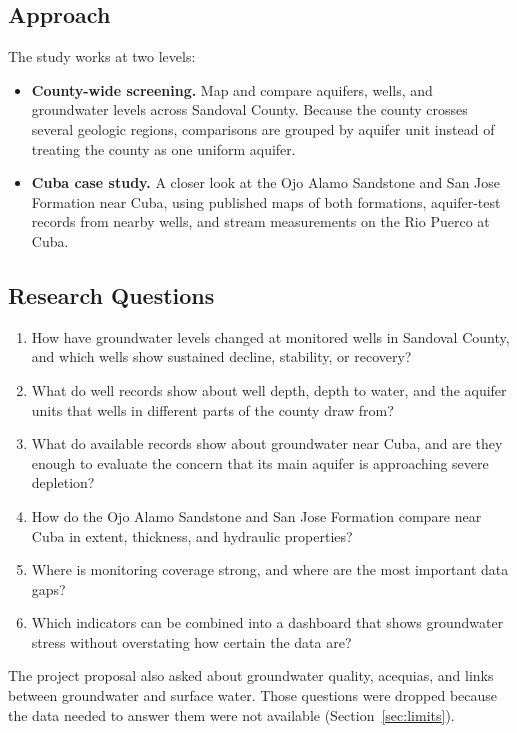\documentclass[10pt,twocolumn,letterpaper]{article}
\begin{document}
\subsection{Approach}
The study works at two levels:
\begin{itemize}
  \item \textbf{County-wide screening.} Map and compare aquifers, wells, and groundwater levels
        across Sandoval County. Because the county crosses several geologic regions, comparisons
        are grouped by aquifer unit instead of treating the county as one uniform aquifer.
  \item \textbf{Cuba case study.} A closer look at the Ojo Alamo Sandstone and San Jose Formation
        near Cuba, using published maps of both formations, aquifer-test records from nearby
        wells, and stream measurements on the Rio Puerco at Cuba.
\end{itemize}

\subsection{Research Questions}
\begin{enumerate}[label={\color{titleblue}\bfseries RQ\arabic*.},leftmargin=2.6em,labelsep=0.4em]
  \item How have groundwater levels changed at monitored wells in Sandoval County, and which wells
        show sustained decline, stability, or recovery?
  \item What do well records show about well depth, depth to water, and the aquifer units that
        wells in different parts of the county draw from?
  \item What do available records show about groundwater near Cuba, and are they enough to
        evaluate the concern that its main aquifer is approaching severe depletion?
  \item How do the Ojo Alamo Sandstone and San Jose Formation compare near Cuba in extent,
        thickness, and hydraulic properties?
  \item Where is monitoring coverage strong, and where are the most important data gaps?
  \item Which indicators can be combined into a dashboard that shows groundwater stress without
        overstating how certain the data are?
\end{enumerate}
The project proposal also asked about groundwater quality, acequias, and links between
groundwater and surface water. Those questions were dropped because the data needed to answer
them were not available (Section~\ref{sec:limits}).
\end{document}
